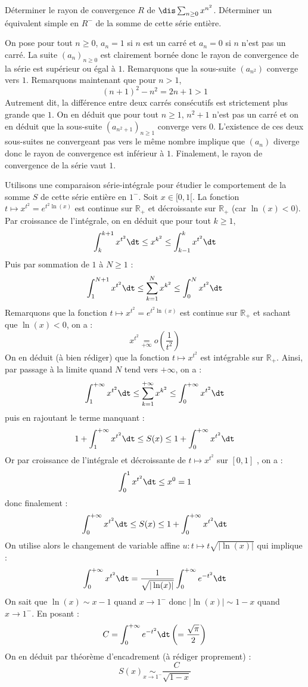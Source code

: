 \documentclass[a4paper,10pt]{report}
\begin{document}
\begin{Exercice}{} Déterminer le rayon de convergence $R$ de $\dis \sum_{n \geq 0} x^{n^2}$. Déterminer un équivalent simple en $R^{-}$ de la somme de cette série entière.
\end{Exercice}

\begin{corr} On pose pour tout $n \geq 0$, $a_n=1$ si $n$ est un carré et $a_n =0$ si $n$ n'est pas un carré. La suite $(a_n)_{n \geq 0}$ est clairement bornée donc le rayon de convergence de la série est supérieur ou égal à $1$. Remarquons que la sous-suite $(a_{n^2})$ converge vers $1$. Remarquons maintenant que pour $n>1$,
$$ (n+1)^2-n^2 = 2n+1>1$$
Autrement dit, la différence entre deux carrés consécutifs est strictement plus grande que $1$. On en déduit que pour tout $n \geq 1$, $n^2+1$ n'est pas un carré et on en déduit que la sous-suite $(a_{n^2+1})_{n \geq 1}$ converge vers $0$. L'existence de ces deux sous-suites ne convergeant pas vers le même nombre implique que $(a_n)$ diverge donc le rayon de convergence est inférieur à $1$. Finalement, le rayon de convergence de la série vaut $1$.

\medskip

\noindent Utilisons une comparaison série-intégrale pour étudier le comportement de la somme $S$ de cette série entière en $1^{-}$. Soit $x \in [0,1[$. La fonction $t \mapsto x^{t^2} = e^{t^2 \ln(x)}$ est continue sur $\mathbb{R}_+$ et décroissante sur $\mathbb{R}_+$ (car $\ln(x)<0$). Par croissance de l'intégrale, on en déduit que pour tout $k \geq 1$,
$$ \int_{k}^{k+1} x^{t^2} \dt \leq x^{k^2} \leq \int_{k-1}^{k} x^{t^2} \dt$$
Puis par sommation de $1$ à $N \geq 1$ :
$$ \int_{1}^{N+1} x^{t^2} \dt \leq \sum_{k=1}^N x^{k^2} \leq \int_{0}^{N} x^{t^2} \dt$$
Remarquons que la fonction $t \mapsto x^{t^2} = e^{t^2 \ln(x)}$ est continue sur $\mathbb{R}_+$ et sachant que $\ln(x)<0$, on a :
$$ x^{t^2} \underset{+ \infty}{=} o \left( \dfrac{1}{t^2} \right)$$
On en déduit (à bien rédiger) que la fonction $t \mapsto x^{t^2}$ est intégrable sur $\mathbb{R}_+$. Ainsi, par passage à la limite quand $N$ tend vers $+ \infty$, on a :
$$  \int_{1}^{+ \infty} x^{t^2} \dt \leq \sum_{k=1}^{+ \infty} x^{k^2} \leq \int_{0}^{+ \infty} x^{t^2} \dt$$
puis en rajoutant le terme manquant :
$$ 1+  \int_{1}^{+ \infty} x^{t^2} \dt \leq S(x) \leq 1+ \int_{0}^{+ \infty} x^{t^2} \dt$$
Or par croissance de l'intégrale et décroissante de $t \mapsto x^{t^2}$ sur $[0,1]$ , on a :
$$ \int_{0}^{1} x^{t^2} \dt \leq x^{0} =1$$
donc finalement :
$$\int_{0}^{+ \infty} x^{t^2} \dt \leq S(x) \leq 1+ \int_{0}^{+ \infty} x^{t^2} \dt$$
On utilise alors le changement de variable affine  $u : t \mapsto t \sqrt{\vert \ln(x) \vert}$ qui implique :
$$ \int_{0}^{+ \infty} x^{t^2} \dt = \dfrac{1}{\sqrt{\vert \ln(x) \vert}} \int_{0}^{+ \infty} e^{-t^2} \dt$$
On sait que $\ln(x) \sim x-1$ quand $x \rightarrow 1^{-}$ donc $\vert \ln(x) \vert \sim 1-x$ quand $x \rightarrow 1^{-}$. En posant :
$$ C =  \int_{0}^{+ \infty} e^{-t^2} \dt \left( = \dfrac{\sqrt{\pi}}{2} \right)$$
On en déduit par théorème d'encadrement (à rédiger proprement) :
$$S(x) \underset{x \rightarrow 1^{-}}{\sim} \dfrac{C}{\sqrt{1-x}}$$
\end{corr}
\end{document}
